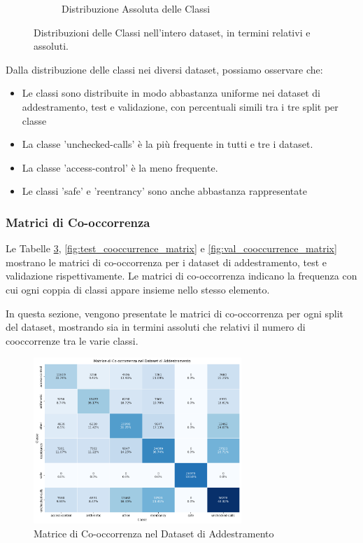 \documentclass[../../Thesis.tex]{subfiles}
\begin{document}
\begin{figure}[h!]
\begin{subfigure}[b]{0.45\linewidth}
      \caption{Distribuzione Assoluta delle Classi}
      \label{fig:absolute_distribution}
    \end{subfigure}
    \caption{Distribuzioni delle Classi nell'intero dataset, in termini relativi e assoluti.}
    \label{fig:class_distributions}
  \end{figure}
  Dalla distribuzione delle classi nei diversi dataset, possiamo osservare che:

  \begin{itemize}
      \item Le classi sono distribuite in modo abbastanza uniforme nei dataset di addestramento, test e validazione, con percentuali simili tra i tre split per classe
      \item La classe 'unchecked-calls' è la più frequente in tutti e tre i dataset.
      \item La classe 'access-control' è la meno frequente.
      \item Le classi 'safe' e 'reentrancy' sono anche abbastanza rappresentate
  \end{itemize}
\subsubsection{Matrici di Co-occorrenza}
Le Tabelle \ref{fig:train_cooccurrence_matrix}, \ref{fig:test_cooccurrence_matrix} e \ref{fig:val_cooccurrence_matrix} mostrano le matrici di co-occorrenza per i dataset di addestramento, test e validazione rispettivamente. Le matrici di co-occorrenza indicano la frequenza con cui ogni coppia di classi appare insieme nello stesso elemento.

In questa sezione, vengono presentate le matrici di co-occorrenza per ogni split del dataset, mostrando sia in termini assoluti che relativi il numero di cooccorrenze tra le varie classi.

\begin{figure}[H]
    \centering
    \includegraphics[width=0.7\textwidth]{../../img/TrainCo-occurrency.png}
    \caption{Matrice di Co-occorrenza nel Dataset di Addestramento}
    \label{fig:train_cooccurrence_matrix}
\end{figure}
\end{document}
